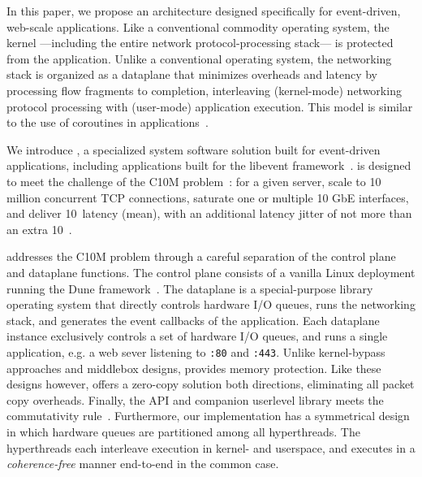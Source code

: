 In this paper, we propose an architecture designed specifically for
event-driven, web-scale applications.  Like a conventional commodity
operating system, the kernel  ---including the entire network protocol-processing stack--- is protected from the application.  Unlike a
conventional operating system, the networking stack is organized as a
dataplane that minimizes overheads and latency by processing flow
fragments to completion, interleaving (kernel-mode) networking
protocol processing with (user-mode) application execution.  
This model is similar to the use of coroutines in applications~\cite{missing}.

We introduce \ix, a specialized system software solution built for
event-driven applications, including applications built for the
libevent framework~\cite{provos2003libevent}.  \ix is designed to meet the
challenge of the C10M problem~\cite{theC10Mproblem}: for a given
server, scale to 10 million concurrent TCP connections, saturate one
or multiple 10 GbE interfaces, and deliver 10~\microsecond latency
(mean), with an additional latency jitter of not more than an extra
10~\microsecond.

\ix addresses the C10M problem through a careful separation of the
control plane and dataplane functions.  The control plane consists of a
vanilla Linux deployment running the Dune
framework~\cite{belay2012dune}.  The dataplane is a special-purpose
library operating system that directly controls hardware I/O queues,
runs the networking stack, and generates the event callbacks of the
application.  Each dataplane instance exclusively controls a set of
hardware I/O queues, and runs a single application, e.g. a web sever
listening to \texttt{:80} and \texttt{:443}.  Unlike kernel-bypass
approaches and middlebox designs, \ix provides memory protection.
Like these designs however, \ix offers a zero-copy solution both
directions, eliminating all packet copy overheads.  Finally, the \ix
API and companion userlevel library meets the commutativity
rule~\cite{DBLP:conf/sosp/ClementsKZMK13}. Furthermore, our
implementation has a symmetrical design in which hardware queues are partitioned among all hyperthreads. 
The hyperthreads each interleave execution in kernel- and userspace, and executes in a
\emph{coherence-free} manner end-to-end in the common case.

